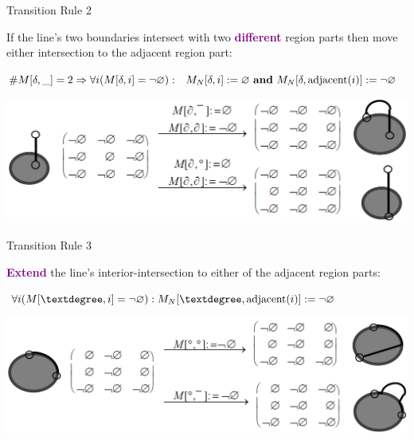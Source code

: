 	\begin{frame}{Transition Rule 2}
		\begin{block}{}
			If the line's two boundaries intersect with two \textcolor{purple}{\textbf{different}} region parts then move either intersection to the adjacent region part:
		\end{block}
		\begin{block}{}
			\centering $ \#M[\delta,\_] = 2 \Rightarrow
			\forall i (M[\delta, i] = \mbox{$\neg\varnothing$}):$
			$M_{N}[\delta, i] := \mbox{$\varnothing$} \text{ \textbf{and} }
			M_{N}[\delta, \text{adjacent}(i)] := \mbox{$\neg\varnothing$} $
		\end{block}
		\begin{block}{}
			\includegraphics[width=\textwidth]{images/smooth_transitions_example_b.png}
		\end{block}
	\end{frame}

	
	\begin{frame}{Transition Rule 3}
		\begin{block}{}
			\textcolor{purple}{\textbf{Extend}} the line's interior-intersection to either of the adjacent region parts:
		\end{block}
		\begin{block}{}
			\centering $ \forall i (M[\textdegree, i] = \NotEmpty):
			M_{N}[\textdegree, \text{adjacent}(i)] := \NotEmpty $
		\end{block}
		\begin{block}{}
			\includegraphics[width=\textwidth]{images/smooth_transitions_example_c.png}
		\end{block}
	\end{frame}
	
